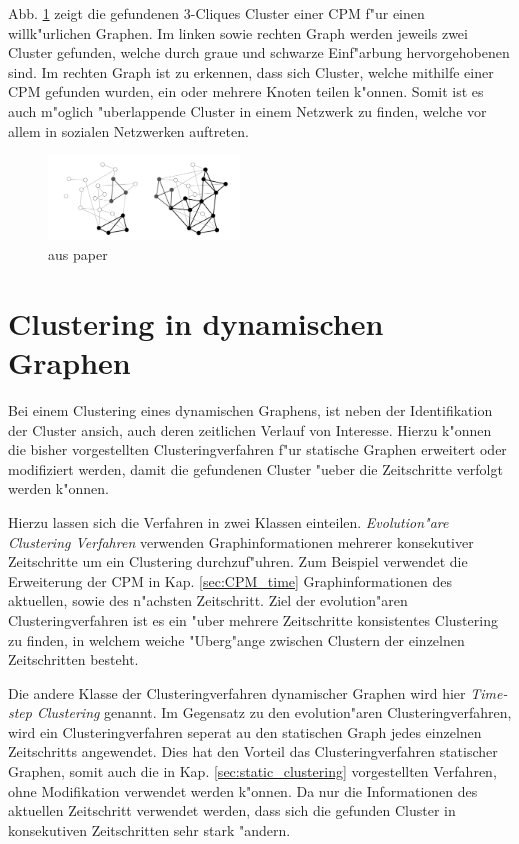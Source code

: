 \documentclass[journal]{vgtc}
\begin{document}
    Abb. \ref{fig:CPM} zeigt die gefundenen 3-Cliques Cluster einer CPM f"ur einen willk"urlichen Graphen.
    Im linken sowie rechten Graph werden jeweils zwei Cluster gefunden, welche durch graue und schwarze
    Einf"arbung hervorgehobenen sind. Im rechten Graph ist zu erkennen, dass sich Cluster, welche mithilfe einer
    CPM gefunden wurden, ein oder mehrere Knoten teilen k"onnen. Somit ist es auch m"oglich "uberlappende Cluster
    in einem Netzwerk zu finden, welche vor allem in sozialen Netzwerken auftreten.
    \begin{figure}[h]
     \centering
     \includegraphics[width=2in]{images/k-cliques}
     \caption{\label{fig:CPM} aus paper}
    \end{figure}


\section{Clustering in dynamischen Graphen}
  \label{sec:dynamic_clustering}
  Bei einem Clustering eines dynamischen Graphens, ist neben der Identifikation der Cluster ansich, auch deren
  zeitlichen Verlauf von Interesse. Hierzu k"onnen die bisher vorgestellten Clusteringverfahren f"ur statische
  Graphen erweitert oder modifiziert werden, damit die gefundenen Cluster "ueber die Zeitschritte verfolgt werden
  k"onnen.
  
  Hierzu lassen sich die Verfahren in zwei Klassen einteilen. \emph{Evolution"are Clustering Verfahren}\cite{evolutionary_clustering}
  verwenden Graphinformationen mehrerer konsekutiver Zeitschritte um ein Clustering durchzuf"uhren. Zum Beispiel verwendet die Erweiterung der CPM
  in Kap. \ref{sec:CPM_time} Graphinformationen des aktuellen, sowie des n"achsten Zeitschritt. Ziel der evolution"aren Clusteringverfahren
  ist es ein "uber mehrere Zeitschritte konsistentes Clustering zu finden, in welchem weiche "Uberg"ange zwischen Clustern der einzelnen Zeitschritten
  besteht.
  
  Die andere Klasse der Clusteringverfahren dynamischer Graphen wird hier \emph{Time-step Clustering} genannt. Im Gegensatz zu den evolution"aren
  Clusteringverfahren, wird ein Clusteringverfahren seperat au den statischen Graph jedes einzelnen Zeitschritts angewendet. Dies hat den Vorteil das
  Clusteringverfahren statischer Graphen, somit auch die in Kap. \ref{sec:static_clustering} vorgestellten Verfahren, ohne Modifikation
  verwendet werden k"onnen. Da nur die Informationen des aktuellen Zeitschritt verwendet werden, dass sich die gefunden Cluster in konsekutiven
  Zeitschritten sehr stark "andern.
  
\end{document}
